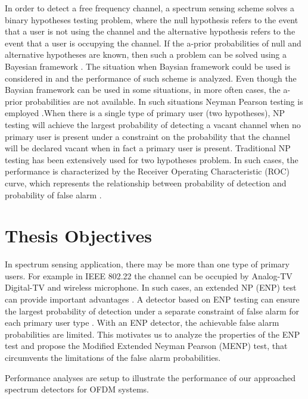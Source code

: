 In order to detect a free frequency channel, a spectrum sensing scheme solves a binary hypotheses testing problem, where the null hypothesis refers to the event that a user is not using the channel and the alternative hypothesis refers to the event that a user is occupying the channel. If the a-prior probabilities of null and alternative hypotheses are known, then such a problem can be solved using a Bayesian framework \cite{poor1994introduction}. The situation when Baysian framework could be used is considered in \cite{zeng2010review} and the performance of such scheme is analyzed.
Even though the Baysian framework can be used in some situations, in more often cases, the a-prior probabilities are not available. In such situations Neyman Pearson testing is employed \cite{poor1994introduction}.When there is a single type of primary user (two hypotheses), NP testing will achieve the largest probability of detecting a vacant channel when no primary user is present under a constraint on the probability that the channel will be declared vacant when in fact a primary user is present.
Traditional NP testing has been extensively used for two hypotheses problem. In such cases,  the performance is characterized by the Receiver Operating Characteristic (ROC) curve, which represents the relationship between probability of detection and probability of false alarm \cite{poor1994introduction}. 

\section{Thesis Objectives}
In spectrum sensing application, there may be more than one type of primary users. For example in IEEE 802.22 \cite{shellhammer2008spectrum} the channel can be occupied by Analog-TV Digital-TV and wireless microphone. 
In such cases, an extended NP (ENP) test can provide important advantages \cite{zhang1999design}. A detector based on ENP testing can ensure the largest probability of detection under a separate constraint of false alarm for each primary user type \cite{LehmannTest}.
With an ENP detector, the achievable false alarm probabilities are limited. This motivates us to analyze the properties of the ENP test and propose the Modified Extended Neyman Pearson (MENP) test, that circumvents the limitations of the false alarm probabilities. 

Performance analyses are setup to illustrate the performance of our approached spectrum detectors for OFDM systems. 

